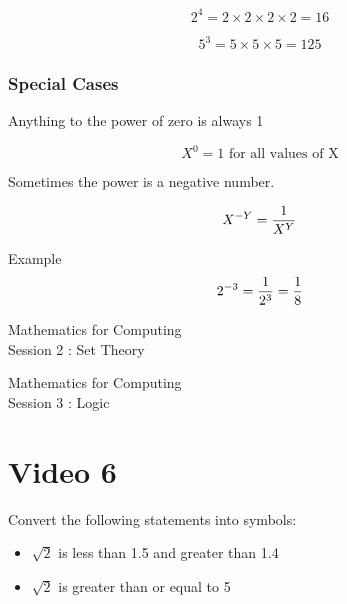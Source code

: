 \documentclass[]{report}
\begin{document}
\[  2^ 4 = 2 \times 2 \times 2 \times 2 = 16 \]

\[  5^ 3 = 5 \times 5 \times 5 =125 \]

\subsubsection{Special Cases}

Anything to the power of zero is always 1

\[  X^ 0 = 1 \mbox{ for all values of X} \]

Sometimes the power is a negative number.

\[  X^{-Y} = { 1 \over X^Y}  \]

Example 
\[  2^{-3} = { 1 \over 2^3} = { 1 \over 8}  \]


\newpage
\begin{center}
\huge{Mathematics for Computing}\\
{ Session 2 : Set Theory}
\end{center}



\newpage
\begin{center}
\huge{Mathematics for Computing}\\
{ Session 3 : Logic}
\end{center}




\section{Video 6}


Convert the following statements into symbols:

\begin{itemize}
\item $\sqrt{2}$ is less than 1.5 and greater than 1.4
\item $\sqrt{2}$ is greater than or equal to 5
\end{itemize}



\end{document}
